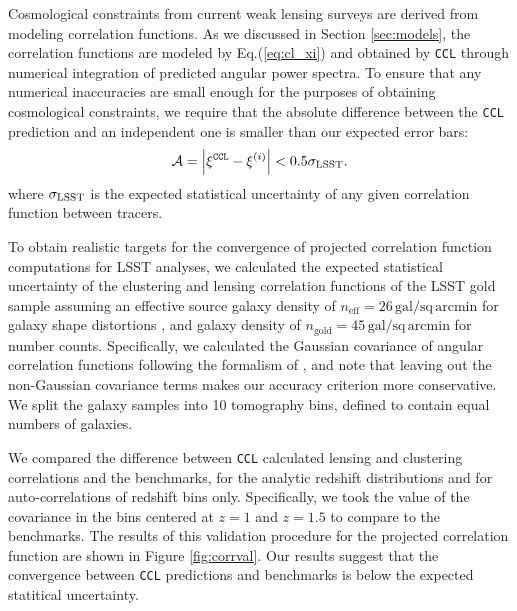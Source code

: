 \documentclass[\docopts]{\docclass}
\newcommand{\ccl}{{\tt CCL}\xspace}
\begin{document}
Cosmological constraints from current weak lensing surveys are derived from modeling correlation functions. As we discussed in Section \ref{sec:models}, the correlation functions are modeled by Eq.(\ref{eq:cl_xi}) and obtained by \ccl through numerical integration of predicted angular power spectra. To ensure that any numerical inaccuracies are small enough for the purposes of obtaining cosmological constraints, we require that the absolute difference between the \ccl prediction and an independent one is smaller than our expected error bars:
\begin{equation}
  \mathcal{A}=\left|\xi^{\tt CCL}-\xi^{(i)}\right|<0.5\sigma_{\rm LSST}.
\end{equation}
where $\sigma_{\rm LSST}$ is the expected statistical uncertainty of any given correlation function between tracers.

To obtain realistic targets for the convergence of projected correlation function computations for LSST analyses, we calculated the expected statistical uncertainty of the clustering and lensing correlation functions of the LSST gold sample \citep{LSSTSB} assuming an effective source galaxy density of $n_\mathrm{eff} = 26\,\mathrm{gal/sq\,arcmin}$ for galaxy shape distortions \citep{Chang13}, and galaxy density of $n_\mathrm{gold} = 45\,\mathrm{gal/sq\,arcmin}$ for number counts. Specifically, we calculated the Gaussian covariance of angular correlation functions following the formalism of \citet{2008A&A...477...43J}, and note that leaving out the non-Gaussian covariance terms makes our accuracy criterion more conservative. We split the galaxy samples into 10 tomography bins, defined to contain equal numbers of galaxies.

We compared the difference between \ccl calculated lensing and clustering correlations and the benchmarks, for the analytic redshift distributions and for auto-correlations of redshift bins only. Specifically, we took the value of the covariance in the bins centered at $z=1$ and $z=1.5$ to compare to the benchmarks. The results of this validation procedure for the projected correlation function are shown in Figure \ref{fig:corrval}. Our results suggest that the convergence between \ccl predictions and benchmarks is below the expected statitical uncertainty. 
\end{document}
